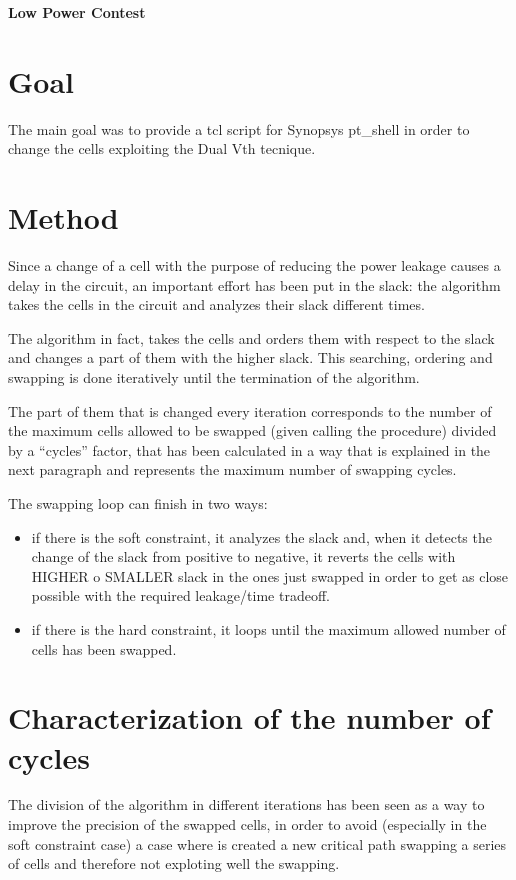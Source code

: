 \documentclass[10pt, english, oneside]{article}
\begin{document}
\begin{center}
  \huge \textbf{Low Power Contest}
\end{center}

\justify

\section{Goal} \label{sec:goal}
The main goal was to provide a tcl script for Synopsys pt\_shell in order to
change the cells exploiting the Dual Vth tecnique.
\section{Method} \label{sec:method}
Since a change of a cell with the purpose of reducing the power leakage causes a
delay in the circuit, an important effort has been put in the slack: the
algorithm takes the cells in the circuit and analyzes their slack different times.

The algorithm in fact, takes the cells and orders them with respect to the slack
and changes a part of them with the higher slack.
This searching, ordering and swapping is done iteratively until the termination of
the algorithm.

The part of them that is changed every iteration corresponds to the number of
the maximum cells allowed to be swapped (given calling the procedure) divided by
a ``cycles'' factor, that has been calculated in a way that is explained in the
next paragraph and represents the maximum number of swapping cycles.

The swapping loop can finish in two ways:
\begin{itemize}
  \item if there is the soft constraint, it analyzes the slack and, when it detects the
change of the slack from positive to negative, it reverts the cells with HIGHER
o SMALLER slack in the ones just swapped in order to get as close possible with
the required leakage/time tradeoff.
  \item if there is the hard constraint, it loops until the maximum allowed number of
cells has been swapped.
\end{itemize}
\section{Characterization of the number of cycles} \label{sec:characterization}
The division of the algorithm in different iterations has been seen as a way to
improve the precision of the swapped cells, in order to avoid (especially in the
soft constraint case) a case where is created a new critical path swapping a
series of cells and therefore not exploting well the swapping.
\end{document}
